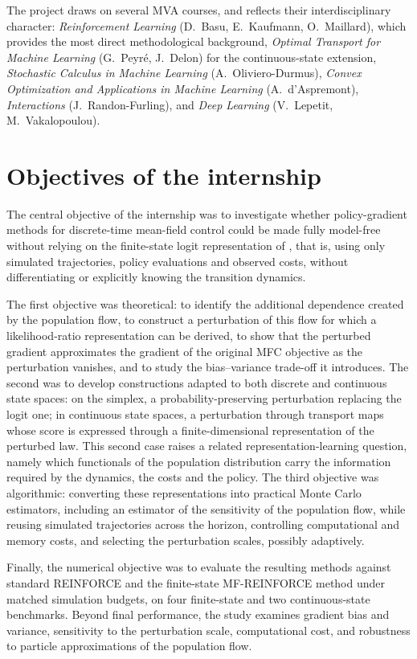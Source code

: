 The project draws on several MVA courses, and reflects their interdisciplinary character: \emph{Reinforcement Learning} (D.~Basu, E.~Kaufmann, O.~Maillard), which provides the most direct methodological background, \emph{Optimal Transport for Machine Learning} (G.~Peyré, J.~Delon) for the continuous-state extension, \emph{Stochastic Calculus in Machine Learning} (A.~Oliviero-Durmus), \emph{Convex Optimization and Applications in Machine Learning} (A.~d'Aspremont), \emph{Interactions} (J.~Randon-Furling), and \emph{Deep Learning} (V.~Lepetit, M.~Vakalopoulou).


\section{Objectives of the internship}

The central objective of the internship was to investigate whether policy-gradient methods for discrete-time mean-field control could be made fully model-free without relying on the finite-state logit representation of \cite{meunier2026model}, that is, using only simulated trajectories, policy evaluations and observed costs, without differentiating or explicitly knowing the transition dynamics.

The first objective was theoretical: to identify the additional dependence created by the population flow, to construct a perturbation of this flow for which a likelihood-ratio representation can be derived, to show that the perturbed gradient approximates the gradient of the original MFC objective as the perturbation vanishes, and to study the bias--variance trade-off it introduces. The second was to develop constructions adapted to both discrete and continuous state spaces: on the simplex, a probability-preserving perturbation replacing the logit one; in continuous state spaces, a perturbation through transport maps whose score is expressed through a finite-dimensional representation of the perturbed law. This second case raises a related representation-learning question, namely which functionals of the population distribution carry the information required by the dynamics, the costs and the policy. The third objective was algorithmic: converting these representations into practical Monte Carlo estimators, including an estimator of the sensitivity of the population flow, while reusing simulated trajectories across the horizon, controlling computational and memory costs, and selecting the perturbation scales, possibly adaptively.

Finally, the numerical objective was to evaluate the resulting methods against standard REINFORCE and the finite-state MF-REINFORCE method under matched simulation budgets, on four finite-state and two continuous-state benchmarks. Beyond final performance, the study examines gradient bias and variance, sensitivity to the perturbation scale, computational cost, and robustness to particle approximations of the population flow.


